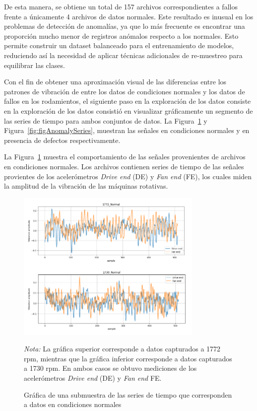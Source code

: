 \documentclass[11pt,a4paper,spanish]{book}
\numberwithin{equation}{chapter}
\numberwithin{figure}{chapter}
\begin{document}
De esta manera, se obtiene un total de 157 archivos correspondientes a fallos frente a 
únicamente 4 archivos de datos normales. Este resultado es inusual en los problemas de 
detección de anomalías, ya que lo más frecuente es encontrar una proporción mucho menor 
de registros anómalos respecto a los normales. Esto permite construir un dataset 
balanceado para el entrenamiento de modelos, reduciendo así la necesidad de aplicar 
técnicas adicionales de re-muestreo para equilibrar las clases.


Con el fin de obtener una aproximación visual de las diferencias entre los patrones de 
vibración de entre los datos de condiciones normales y los datos de fallos en los 
rodamientos, el siguiente paso en la exploración de los datos consiste en la exploración 
de los datos consistió en visualizar gráficamente un segmento de las series de tiempo 
para ambos conjuntos de datos. La Figura~\ref{fig:figNormalSeries} y 
Figura~\ref{fig:figAnomalySeries}, muestran las señales en condiciones normales y en 
presencia de defectos respectivamente. 


La Figura~\ref{fig:figNormalSeries} muestra el comportamiento de las señales provenientes
de archivos en condiciones normales. Los archivos contienen series de tiempo de las señales
provientes de los acelerómetros \textit{Drive end} (DE) y \textit{Fan end} (FE), los cuales
miden la amplitud de la vibración de las máquinas rotativas. 


\begin{figure}[H]
	\caption{Gráfica de una submuestra de las series de tiempo que corresponden a datos 
    en condiciones normales}    
    \centering
    \includegraphics[width=0.8\textwidth]{media/dataset/normal-series.png}
    \label{fig:figNormalSeries}
    \parbox{\textwidth}{\footnotesize \textit{Nota:} La gráfica superior corresponde a
    datos capturados a 1772 rpm, mientras que la gráfica inferior corresponde a 
    datos capturados a 1730 rpm. En ambos casos se obtuvo mediciones de los acelerómetros
    \textit{Drive end} (DE) y \textit{Fan end} FE.}

\end{figure}
\end{document}

